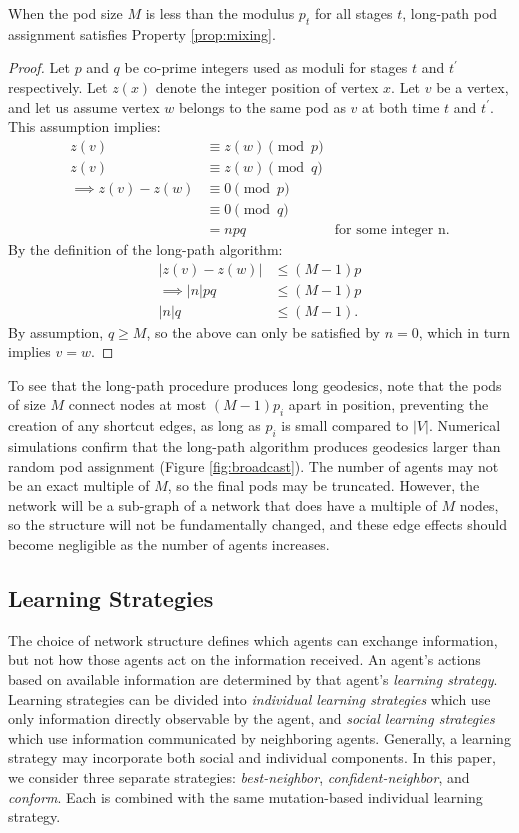 \begin{claim}
When the pod size $M$ is less than the modulus $p_t$ for all stages $t$, long-path pod assignment satisfies Property \ref{prop:mixing}.
\end{claim}

\begin{proof}
Let $p$ and $q$ be co-prime integers used as moduli for stages $t$ and $t^\prime$ respectively.
Let $z(x)$ denote the integer position of vertex $x$.
Let $v$ be a vertex, and let us assume vertex $w$ belongs to the same pod as $v$ at both time $t$ and $t^\prime$.
This assumption implies:
\begin{align*}
    z(v) &\equiv z(w) \pmod{p} \\
    z(v) &\equiv z(w) \pmod{q} \\
    \implies z(v) - z(w) &\equiv 0 \pmod{p} \\
    &\equiv 0 \pmod{q} \\
    &= npq & \text{for some integer n}.
\end{align*}
By the definition of the long-path algorithm:
\begin{align*}
    |z(v)-z(w)| & \leq (M - 1)p \\
    \implies |n|pq & \leq (M - 1)p \\
    |n|q & \leq (M - 1).
\end{align*}
By assumption, $q \geq M$, so the above can only be satisfied by $n=0$,
which in turn implies $v=w$. \qedhere
\end{proof}

To see that the long-path procedure produces long geodesics, note that the pods of size $M$ connect nodes at most $(M - 1)p_i$ apart in position, preventing the creation of any shortcut edges, as long as $p_i$ is small compared to $|V|$.
Numerical simulations confirm that the long-path algorithm produces geodesics larger than random pod assignment (Figure \ref{fig:broadcast}).
The number of agents may not be an exact multiple of $M$, so the final pods may be truncated. However, the network will be a sub-graph of a network that does have a multiple of $M$ nodes, so the structure will not be fundamentally changed, and these edge effects should become negligible as the number of agents increases.


\subsection{Learning Strategies}
The choice of network structure defines which agents can exchange information, but not how those agents act on the information received. An agent's actions based on available information are determined by that agent's {\em learning strategy}. Learning strategies can be divided into {\em individual learning strategies} which use only information directly observable by the agent, and {\em social learning strategies} which use information communicated by neighboring agents.
Generally, a learning strategy may incorporate both social and individual components.
In this paper, we consider three separate strategies: {\em best-neighbor}, {\em confident-neighbor}, and {\em conform}.
Each is combined with the same mutation-based individual learning strategy.

